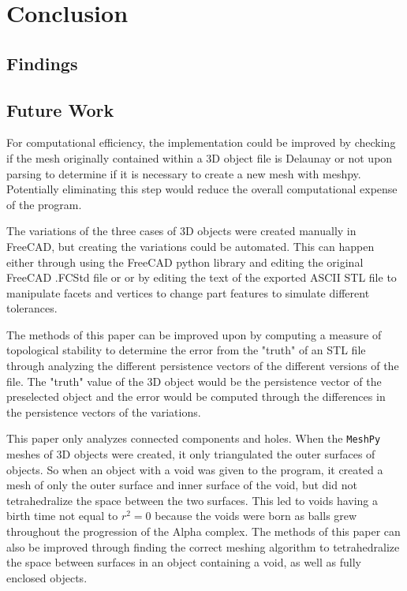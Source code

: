 \documentclass[ma]{uncgdissertationexp}
\theoremstyle{plain}
\theoremstyle{definition}
\theoremstyle{remark}
\begin{document}
\chapter{Conclusion}
\section{Findings}

\newpage
\section{Future Work}
\par For computational efficiency, the implementation could be improved by checking if the mesh originally contained within a 3D object file is Delaunay or not upon parsing to determine if it is necessary to create a new mesh with meshpy. Potentially eliminating this step would reduce the overall computational expense of the program.
\par The variations of the three cases of 3D objects were created manually in FreeCAD, but creating the variations could be automated. This can happen either through using the FreeCAD python library and editing the original FreeCAD .FCStd file or or by editing the text of the exported ASCII STL file to manipulate facets and vertices to change part features to simulate different tolerances.
\par The methods of this paper can be improved upon by computing a measure of topological stability to determine the error from the "truth" of an STL file through analyzing the different persistence vectors of the different versions of the file. The "truth" value of the 3D object would be the persistence vector of the preselected object and the error would be computed through the differences in the persistence vectors of the variations.
\par This paper only analyzes connected components and holes. When the \verb"MeshPy" meshes of 3D objects were created, it only triangulated the outer surfaces of objects. So when an object with a void was given to the program, it created a mesh of only the outer surface and inner surface of the void, but did not tetrahedralize the space between the two surfaces. This led to voids having a birth time not equal to $r^{2}=0$ because the voids were born as balls grew throughout the progression of the Alpha complex. The methods of this paper can also be improved through finding the correct meshing algorithm to tetrahedralize the space between surfaces in an object containing a void, as well as fully enclosed objects.



\backmatter
\end{document}
